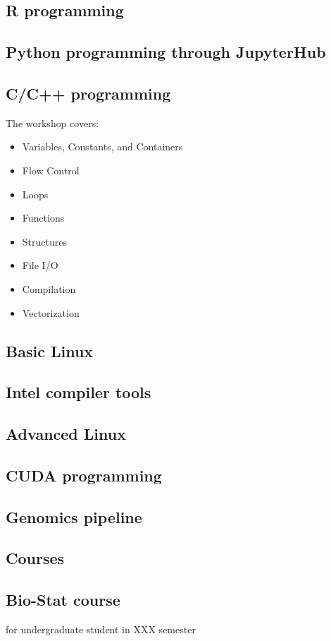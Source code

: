 \documentclass[conference]{IEEEtran}
\begin{document}
\subsection*{R programming}
\subsection*{Python programming through JupyterHub}

\subsection*{C/C++ programming}
The workshop covers:
    \begin{itemize}
    \item Variables, Constants, and Containers
    \item Flow Control
    \item Loops
    \item Functions
    \item Structures
    \item File I/O
    \item Compilation
    \item Vectorization
    \end{itemize}

\subsection*{Basic Linux}
\subsection*{Intel compiler tools}
\subsection*{Advanced Linux}
\subsection*{CUDA programming}
\subsection*{Genomics pipeline}


\subsection{Courses}

\subsection*{Bio-Stat course}
for undergraduate student in XXX semester
\end{document}

